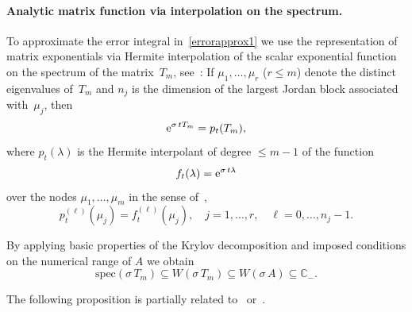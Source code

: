 \documentclass[smallextended]{svjour3pre}%
\numberwithin{equation}{section}
\numberwithin{figure}{section}
\numberwithin{table}{section}
\newcommand{\C}{\mathbb C}%
\newcommand\tjnew[1]{{#1}}
\newcommand{\ee}{{\rm e}}
\newcommand\sca{\sigma}
\newcommand\Opgen{A}
\begin{document}
\paragraph{Analytic matrix function via interpolation on the spectrum.}
To approximate the error integral in~\eqref{errorapprox1}
we use the representation of matrix exponentials via Hermite
interpolation of the scalar exponential function on the spectrum
of the matrix~$ T_m $, see~\cite[Chap.~1]{higham08}:
If $\mu_1,\ldots,\mu_r$ ($ r \leq m $)
denote the distinct eigenvalues of~$ T_m $
and $ n_j $ is the dimension of the largest Jordan block associated
with~$ \mu_j $, then
\begin{equation}\label{pt}
\ee^{\sca\,t T_m} = p_t(T_m),
\end{equation}
where $ p_t(\lambda) $ is the {Hermite}
interpolant of degree $ \leq m-1 $ of
the function
\begin{equation}\label{def:thetadd}
{f_t}(\lambda) = \ee^{\sca\,t\lambda}
\end{equation}
over the nodes $ \mu_1,\ldots,\mu_m $ in the sense of~\cite[(1.7)]{higham08},
\begin{equation*}
p_t^{(\ell)}(\mu_j) = f_t^{(\ell)}(\mu_j),
\quad j=1,\ldots,r, \quad \ell=0,\ldots,n_j-1.
\end{equation*}

By applying basic properties of the Krylov decomposition and
imposed conditions on the numerical range
of $\Opgen$ we obtain
\begin{equation}\label{subsetofspectrum}
\text{spec}(\sca\,T_m) \subseteq
W(\sca\,T_m) \subseteq
W(\sca\,\Opgen) \subseteq \C_-.
\end{equation}

The following proposition is partially related to~\tjnew{\cite[Sec.~3]{CeMo97}} or~\cite{chinesen17}.
\end{document}
